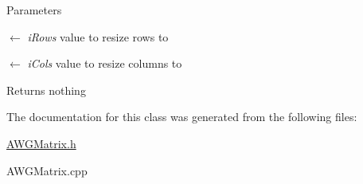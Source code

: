 \begin{DoxyParams}{Parameters}
\item[\mbox{$\leftarrow$} {\em iRows}]value to resize rows to \item[\mbox{$\leftarrow$} {\em iCols}]value to resize columns to \end{DoxyParams}
\begin{DoxyReturn}{Returns}
nothing 
\end{DoxyReturn}


The documentation for this class was generated from the following files:\begin{DoxyCompactItemize}
\item 
\hyperlink{AWGMatrix_8h}{AWGMatrix.h}\item 
AWGMatrix.cpp\end{DoxyCompactItemize}
